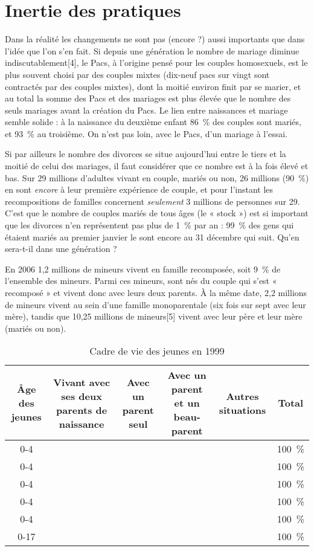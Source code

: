 
\chapter{Inertie des pratiques}


 Dans la réalité les changements ne sont pas (encore ?) aussi importants que dans l'idée que l'on s'en fait. Si depuis une génération le nombre de mariage diminue indiscutablement[4], le Pacs, à l'origine pensé pour les couples homosexuels, est le plus souvent choisi par des couples mixtes (dix-neuf pacs sur vingt sont contractés par des couples mixtes), dont la moitié environ finit par se marier, et au total la somme des Pacs et des mariages est plus élevée que le nombre des seuls mariages avant la création du Pacs. Le lien entre naissances et mariage semble solide : à la naissance du deuxième enfant 86~\% des couples sont mariés, et 93~\% au troisième. On n'est pas loin, avec le Pacs, d'un mariage à l'essai.

 Si par ailleurs le nombre des divorces se situe aujourd'hui entre le tiers et la moitié de celui des mariages, il faut considérer que ce nombre est à la fois élevé et bas. Sur 29 millions d'adultes vivant en couple, mariés ou non, 26 millions (90~\%) en sont \emph{encore} à leur première expérience de couple, et pour l'instant les recompositions de familles concernent \emph{seulement} 3 millions de personnes sur 29. C'est que le nombre de couples mariés de tous âges (le « stock ») est si important que les divorces n'en représentent pas plus de 1~\% par an : 99~\% des gens qui étaient mariés au premier janvier le sont encore au 31 décembre qui suit. Qu'en sera-t-il dans une génération ?

 En 2006 1,2 millions de mineurs vivent en famille recomposée, soit 9~\% de l'ensemble des mineurs. Parmi ces mineurs,  sont nés du couple qui s'est « recomposé » et vivent donc avec leurs deux parents. À la même date, 2,2 millions de mineurs vivent au sein d'une famille monoparentale (six fois sur sept avec leur mère), tandis que 10,25 millions de mineurs[5] vivent avec leur père et leur mère (mariés ou non). 
 

\begin{table}[h]
\centering
\caption{Cadre de vie des jeunes en 1999}
\begin{tabular*}{\linewidth}{cccccc}
Âge des jeunes & Vivant avec ses deux parents de naissance & Avec un parent seul & Avec un parent et un beau-parent & Autres situations & Total\\
\hline
 0-4 &  &  &  &  & 100~\% \\
 0-4 &  &  &  &  & 100~\% \\
 0-4 &  &  &  &  & 100~\% \\
 0-4 &  &  &  &  & 100~\% \\
 0-4 &  &  &  &  & 100~\% \\
\hline
 0-17 &  &  &  &  & 100~\%
\end{tabular*}
\end{table}
 

